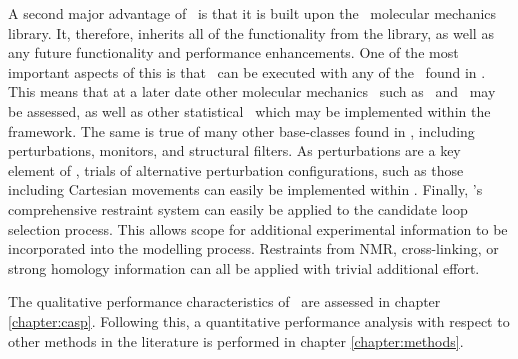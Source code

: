 A second major advantage of \prearcus\ is that it is built upon the \pd\ molecular mechanics library. It, therefore, inherits all of the functionality from the library, as well as any future functionality and performance enhancements.
One of the most important aspects of this is that \prearcus\ can be executed with any of the \forcefields\ found in \pd.
This means that at a later date other molecular mechanics \forcefields\ such as \opls\ and \charmm\ may be assessed, as well as other statistical \forcefields\ which may be implemented within the framework.
The same is true of many other base-classes found in \pd, including perturbations, monitors, and structural filters. As perturbations are a key element of \prearcus, trials of alternative perturbation configurations, such as those including Cartesian movements can easily be implemented within \pd.
Finally, \pd's comprehensive restraint system can easily be applied to the candidate loop selection process. This allows scope for additional experimental information to be incorporated into the modelling process. Restraints from NMR, cross-linking, or strong homology information can all be applied with trivial additional effort.

The qualitative performance characteristics of \prearcus\ are assessed in chapter \ref{chapter:casp}. Following this, a quantitative performance analysis with respect to other methods in the literature is performed in chapter \ref{chapter:methods}.









